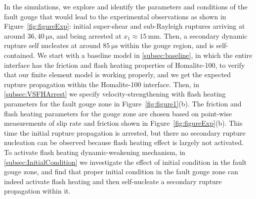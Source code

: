 \documentclass[final,a4paper]{elsarticle}
\begin{document}
In the simulations, 
we explore and identify the parameters and conditions of the fault gouge that would lead to the experimental observations as shown in Figure~\ref{fig:figureExp}:
initial super-shear and sub-Rayleigh ruptures arriving at around $36, 40\ \mathrm{\mu s}$, 
and being arrested at $x_1 \approx 15\ \mathrm{mm}$. 
Then, 
a secondary dynamic rupture self nucleates at around $85\ \mathrm{\mu s}$ within the gouge region, 
and is self-contained. 
We start with a baseline model in \ref{subsec:baseline}, 
in which the entire interface has the friction and flash heating properties of Homalite-100, 
to verify that our finite element model is working properly, 
and we get the expected rupture propagation within the Homalite-100 interface. 
Then, 
in \ref{subsec:VSFHArrest} we specify velocity-strengthening with flash heating parameters for the fault gouge zone in Figure~\ref{fig:figure1}(b). 
The friction and flash heating parameters for the gouge zone are chosen based on point-wise measurements of slip rate and friction shown in Figure~\ref{fig:figureExp}(b). 
This time the initial rupture propagation is arrested, 
but there no secondary rupture nucleation can be observed because flash heating effect is largely not activated. 
To activate flash heating dynamic-weakening mechanism, 
in \ref{subsec:InitialCondition} we investigate the effect of initial condition in the fault gouge zone, 
and find that proper initial condition in the fault gouge zone can indeed activate flash heating and then self-nucleate a secondary rupture propagation within it. 

\FloatBarrier
\end{document}
